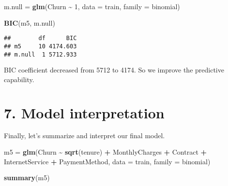 \documentclass[
]{article}
\newenvironment{Shaded}{\begin{snugshade}}{\end{snugshade}}
\newcommand{\AttributeTok}[1]{\textcolor[rgb]{0.13,0.29,0.53}{#1}}
\newcommand{\DecValTok}[1]{\textcolor[rgb]{0.00,0.00,0.81}{#1}}
\newcommand{\FunctionTok}[1]{\textcolor[rgb]{0.13,0.29,0.53}{\textbf{#1}}}
\newcommand{\NormalTok}[1]{#1}
\newcommand{\OtherTok}[1]{\textcolor[rgb]{0.56,0.35,0.01}{#1}}
\newcommand{\SpecialCharTok}[1]{\textcolor[rgb]{0.81,0.36,0.00}{\textbf{#1}}}
\begin{document}
\begin{Shaded}
\begin{Highlighting}[]
\NormalTok{m.null }\OtherTok{=} \FunctionTok{glm}\NormalTok{(Churn }\SpecialCharTok{\textasciitilde{}} \DecValTok{1}\NormalTok{, }\AttributeTok{data =}\NormalTok{ train, }\AttributeTok{family =}\NormalTok{ binomial)}

\FunctionTok{BIC}\NormalTok{(m5, m.null)}
\end{Highlighting}
\end{Shaded}

\begin{verbatim}
##        df      BIC
## m5     10 4174.603
## m.null  1 5712.933
\end{verbatim}

BIC coefficient decreased from 5712 to 4174. So we improve the
predictive capability.

\hypertarget{model-interpretation}{%
\section{7. Model interpretation}\label{model-interpretation}}

Finally, let's summarize and interpret our final model.

\begin{Shaded}
\begin{Highlighting}[]
\NormalTok{m5 }\OtherTok{=} \FunctionTok{glm}\NormalTok{(Churn }\SpecialCharTok{\textasciitilde{}} \FunctionTok{sqrt}\NormalTok{(tenure) }\SpecialCharTok{+}\NormalTok{ MonthlyCharges }\SpecialCharTok{+}\NormalTok{ Contract }\SpecialCharTok{+}\NormalTok{ InternetService }\SpecialCharTok{+}
\NormalTok{    PaymentMethod, }\AttributeTok{data =}\NormalTok{ train, }\AttributeTok{family =}\NormalTok{ binomial)}

\FunctionTok{summary}\NormalTok{(m5)}
\end{Highlighting}
\end{Shaded}
\end{document}
